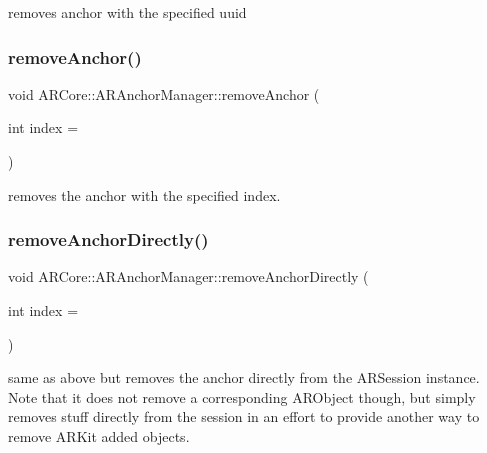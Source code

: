removes anchor with the specified uuid 

\mbox{\label{class_a_r_core_1_1_a_r_anchor_manager_a471d6e5694d6aecb810b65a909cf72b1}} 
\subsubsection{\texorpdfstring{remove\+Anchor()}{removeAnchor()}\hspace{0.1cm}{\footnotesize\ttfamily [2/2]}}
{\footnotesize\ttfamily void A\+R\+Core\+::\+A\+R\+Anchor\+Manager\+::remove\+Anchor (\begin{DoxyParamCaption}\item[{int}]{index = {} }\end{DoxyParamCaption})}



removes the anchor with the specified index. 

\mbox{\label{class_a_r_core_1_1_a_r_anchor_manager_aeaa578780e37129fb899b3f5a762af63}} 
\subsubsection{\texorpdfstring{remove\+Anchor\+Directly()}{removeAnchorDirectly()}}
{\footnotesize\ttfamily void A\+R\+Core\+::\+A\+R\+Anchor\+Manager\+::remove\+Anchor\+Directly (\begin{DoxyParamCaption}\item[{int}]{index = {} }\end{DoxyParamCaption})}

same as above but removes the anchor directly from the A\+R\+Session instance. Note that it does not remove a corresponding A\+R\+Object though, but simply removes stuff directly from the session in an effort to provide another way to remove A\+R\+Kit added objects. \mbox{\label{class_a_r_core_1_1_a_r_anchor_manager_a65690e39286b733631eb52c8e740bc79}} 
